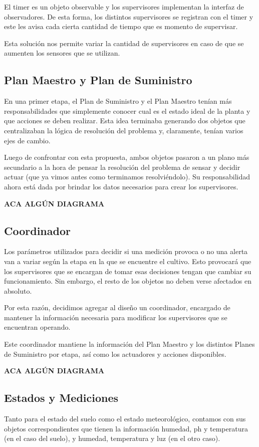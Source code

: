 El timer es un objeto observable y los supervisores implementan la interfaz de observadores. De esta forma, los distintos supervisores se registran con el timer y este les avisa cada cierta cantidad de tiempo que es momento de supervisar.

Esta solución nos permite variar la cantidad de supervisores en caso de que se aumenten los sensores que se utilizan.

\subsection{Plan Maestro y Plan de Suministro}
En una primer etapa, el Plan de Suministro y el Plan Maestro tenían más responsabilidades que simplemente conocer cual es el estado ideal de la planta y que acciones se deben realizar. Esta idea terminaba generando dos objetos que centralizaban la lógica de resolución del problema y, claramente, tenían varios ejes de cambio.

Luego de confrontar con esta propuesta, ambos objetos pasaron a un plano más secundario a la hora de pensar la resolución del problema de sensar y decidir actuar (que ya vimos antes como terminamos resolviéndolo). Su responsabilidad ahora está dada por brindar los datos necesarios para crear los supervisores.

\textbf{ACA ALGÚN DIAGRAMA}

\subsection{Coordinador}
Los parámetros utilizados para decidir si una medición provoca o no una alerta van a variar según la etapa en la que se encuentre el cultivo. Esto provocará que los supervisores que se encargan de tomar esas decisiones tengan que cambiar su funcionamiento. Sin embargo, el resto de los objetos no deben verse afectados en absoluto.

Por esta razón, decidimos agregar al diseño un coordinador, encargado de mantener la información necesaria para modificar los supervisores que se encuentran operando. 

Este coordinador mantiene la información del Plan Maestro y los distintos Planes de Suministro por etapa, así como los actuadores y acciones disponibles.

\textbf{ACA ALGÚN DIAGRAMA}

\subsection{Estados y Mediciones}
Tanto para el estado del suelo como el estado meteorológico, contamos con sus objetos correspondientes que tienen la información humedad, ph y temperatura (en el caso del suelo), y humedad, temperatura y luz (en el otro caso).

